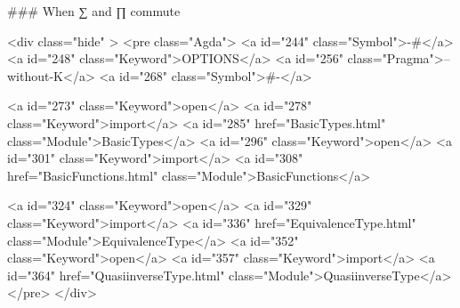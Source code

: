   ### When ∑ and ∏ commute


<div class="hide" >
<pre class="Agda">
<a id="244" class="Symbol">{-#</a> <a id="248" class="Keyword">OPTIONS</a> <a id="256" class="Pragma">--without-K</a> <a id="268" class="Symbol">#-}</a>

<a id="273" class="Keyword">open</a> <a id="278" class="Keyword">import</a> <a id="285" href="BasicTypes.html" class="Module">BasicTypes</a>
<a id="296" class="Keyword">open</a> <a id="301" class="Keyword">import</a> <a id="308" href="BasicFunctions.html" class="Module">BasicFunctions</a>

<a id="324" class="Keyword">open</a> <a id="329" class="Keyword">import</a> <a id="336" href="EquivalenceType.html" class="Module">EquivalenceType</a>
<a id="352" class="Keyword">open</a> <a id="357" class="Keyword">import</a> <a id="364" href="QuasiinverseType.html" class="Module">QuasiinverseType</a>
</pre>
</div>


